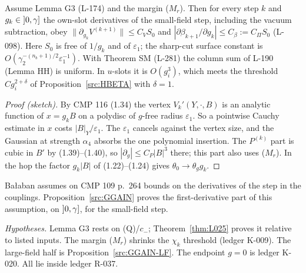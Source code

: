 \begin{proposition}\label{src:GGAIN}
Assume Lemma G3 (L-174) and the margin ($M_r$). Then for every step $k$ and $g_k\in\mathopen{]}0,\gamma\mathclose{]}$ the own-slot derivatives of the small-field step, including the vacuum subtraction, obey $\|\partial_{g_k}V^{(k+1)}\|\le C_VS_0$ and $|\partial\beta_{k+1}/\partial g_k|\le C_\beta:=C_\Pi S_0$ (L-098). Here $S_0$ is free of $1/g_k$ and of $\varepsilon_1$; the sharp-cut surface constant is $O(\gamma_2^{-(n_b+1)/2}\varepsilon_1^{-1})$. With Theorem SM (L-281) the column sum of L-190 (Lemma HH) is uniform. In $u$-slots it is $O(g_i^3)$, which meets the threshold $Cg_i^{2+\delta}$ of Proposition~\ref{src:HBETA} with $\delta=1$.
\end{proposition}
\begin{proof}[Proof (sketch)]
By CMP 116 (1.34) the vertex $V_k'(Y,\cdot,B)$ is an analytic function of $x=g_kB$ on a polydisc of $g$-free radius $\varepsilon_1$. So a pointwise Cauchy estimate in $x$ costs $|B|_Y/\varepsilon_1$. The $\varepsilon_1$ cancels against the vertex size, and the Gaussian at strength $\alpha_4$ absorbs the one polynomial insertion. The $P^{(k)}$ part is cubic in $B'$ by (1.39)--(1.40), so $|\partial_g|\le C_P|B|^3$ there; this part also uses ($M_r$). In the hop the factor $g_k|B|$ of (1.22)--(1.24) gives $\theta_0\to\theta_gg_k$.
\end{proof}
\begin{remark}
Ba{\l}aban assumes on CMP 109 p.~264 bounds on the derivatives of the step in the couplings. Proposition~\ref{src:GGAIN} proves the first-derivative part of this assumption, on $\mathopen{]}0,\gamma\mathclose{]}$, for the small-field step.
\end{remark}
\emph{Hypotheses.} Lemma G3 rests on (Q)/$c_-$; Theorem~\ref{thm:L025} proves it relative to listed inputs. The margin ($M_r$) shrinks the $\chi_k$ threshold (ledger K-009). The large-field half is Proposition~\ref{src:GGAIN-LF}. The endpoint $g=0$ is ledger K-020. All lie inside ledger R-037.


